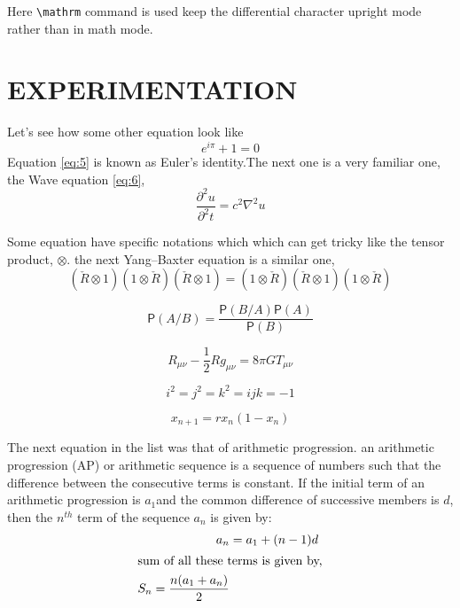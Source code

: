 \documentclass[12pt,a4paper]{report}
\newcommand*{\prob}{\mathsf{P}}
\begin{document}
Here \lstinline[language={[LaTeX]TeX},basicstyle=\ttfamily]{\mathrm} command is used keep the differential character upright mode rather than in math mode.

\chapter{\MakeUppercase{Experimentation}}
\lipsum[1]
Let's see how some other equation look like 
\begin{equation}
    \label{eq:5}
    e^{i\pi} + 1 = 0
\end{equation}
Equation \ref{eq:5} is known as Euler's identity.The next one is a very familiar one, the Wave equation \ref{eq:6},
\begin{equation}  \label{eq:6}
\frac{\partial^2{u}}{\partial^2{t}} = c^2 \nabla^2 u
\end{equation}

Some equation have specific notations which which can get tricky like the tensor product, $\otimes$. the next Yang–Baxter equation is a similar one,
\begin{equation}
    \label{eq:7}
    (\check{R}\otimes1)(1\otimes\check{R})(\check{R}\otimes1) = (1\otimes\check{R})(\check{R}\otimes1)(1\otimes\check{R})
\end{equation}

\begin{equation}
    \label{eq:8}
    \prob(A/B) = \frac{\prob (B/A)  \prob (A)}{\prob (B)}
\end{equation}

\begin{equation}
    \label{eq:9}
    R_{\mu\nu} - \frac{1}{2}Rg_{\mu\nu} = 8\pi G T_{\mu\nu}
\end{equation}

\begin{equation}
    \label{eq:10}
    i^{2} = j^{2} = k^{2} = ijk = -1
\end{equation}

\begin{equation}
    \label{eq:11}
    x_{n+1} = rx_{n}(1-x_{n})
\end{equation}

The next equation in the list was that of arithmetic  progression. an arithmetic progression (AP) or arithmetic sequence is a sequence of numbers such that the difference between the consecutive terms is constant. If the initial term of an arithmetic progression is $a_{1}$and the common difference of successive members is $d$, then the $n^{th}$ term of the sequence $a_{n}$ is given by:
\begin{subequations}
    \begin{align}   
       a_{n} &= a_{1} + (n-1)d  \label{eq:12_a}\\
       \intertext{sum of all these terms is given by,}
       S_{n} = \frac{n(a_{1}+a_{n})}{2} \label{eq:12_b}
    \end{align}
\end{subequations}
\end{document}
